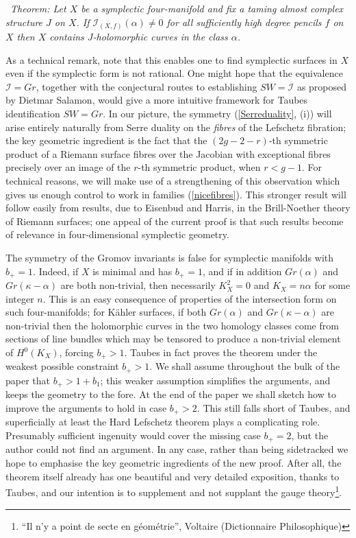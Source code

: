 \documentclass[10pt]{article}
\newcounter{Universal}[section]
\renewcommand{\theUniversal}{\thesection.\arabic{Universal}}
\newenvironment{Italic}{\refstepcounter{Universal} \par \vspace{0.5cm}
\noindent {\bf (\theUniversal)}\ \it}{\par \vspace{0.5cm}}
\newenvironment{Thm}{\begin{Italic}{\sc Theorem: }}{\end{Italic}}
\begin{document}
\begin{Thm}
Let $X$ be a symplectic four-manifold and fix a taming almost complex
structure $J$ on $X$.
If $\mathcal{I}_{(X,f)}(\alpha) \neq 0$ for all sufficiently high
degree pencils $f$ on $X$ then $X$ contains $J$-holomorphic curves in the
class $\alpha$.
\end{Thm}

\noindent  As a technical remark, note that this enables one to find
symplectic surfaces in $X$ even if the symplectic form is not
rational.  One might hope that the equivalence
$\mathcal{I} = Gr$, together with the conjectural
routes to establishing $SW = \mathcal{I}$ as proposed by
Dietmar Salamon, would give a more intuitive framework for  
Taubes identification $SW = Gr$.
In our picture, the symmetry (\ref{Serreduality}, (i)) will
arise entirely 
naturally from Serre duality on the \emph{fibres} of the Lefschetz fibration;
the key geometric ingredient is the fact that the $(2g-2-r)$-th
symmetric product of a Riemann surface fibres over the Jacobian with
exceptional fibres precisely over an image of the $r$-th symmetric
product, when $r < g-1$.  For technical reasons, we will make use of a
strengthening of
this observation which gives us enough control to work in families
(\ref{nicefibres}). 
This stronger result will follow easily from results, due to Eisenbud
and Harris, in the
Brill-Noether theory of Riemann surfaces;
one appeal of the current proof is that such results become of
relevance in four-dimensional symplectic geometry. 

\vspace{0.2cm}

\noindent The symmetry of the Gromov invariants is false for
symplectic manifolds with $b_+=1$.  Indeed, if $X$ is minimal and has
$b_+=1$, and if in addition $Gr(\alpha)$ and $Gr(\kappa-\alpha)$ are
both non-trivial, then necessarily $K_X^2=0$ and $K_X = n\alpha$ for
some integer $n$.  This is an easy consequence of properties of the
intersection form on such four-manifolds; for K\"ahler surfaces, if
both $Gr(\alpha)$ and $Gr(\kappa-\alpha)$ are non-trivial then the
holomorphic curves in the two homology classes come from sections of
line bundles which may be tensored to produce a non-trivial element of
$H^0(K_X)$, forcing $b_+ > 1$.  Taubes in fact proves the theorem
under the weakest 
possible constraint $b_+>1$.  We shall assume throughout the bulk of
the paper that $b_+>1+b_1$; this weaker assumption simplifies the
arguments, and keeps the geometry to the fore.  At the end of the
paper we shall sketch how to improve the arguments to hold in case
$b_+>2$.  This still falls short of Taubes, and superficially at least
the Hard Lefschetz theorem plays a complicating role.  Presumably
sufficient ingenuity would cover the missing case $b_+=2$, but the
author could not find an argument.
In any case, rather than being sidetracked we hope to emphasise the
key geometric ingredients of the new proof.  After all, the theorem
itself already has one beautiful and very detailed exposition, thanks
to Taubes, and our intention is to supplement and not supplant the
gauge theory\footnote{``Il n'y a point de secte en g\'eom\'etrie'',
  Voltaire (Dictionnaire Philosophique)}. 
 
\end{document}
